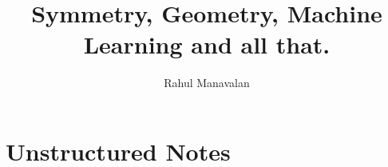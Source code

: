 \documentclass{article}
\title{Symmetry, Geometry, Machine Learning and all that.}
\author{Rahul Manavalan}
\date{}
\begin{document}
\maketitle

\section{Unstructured Notes}

\printbibliography
\end{document}
